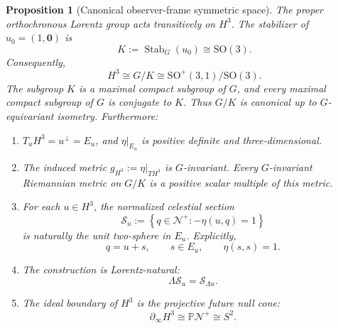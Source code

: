 \documentclass[11pt]{article}
\newtheorem{proposition}[theorem]{Proposition}
\begin{document}
\begin{proposition}[Canonical observer-frame symmetric space]
\label{prop:h3-frame-space}
The proper orthochronous Lorentz group acts transitively on \(H^3\). The
stabilizer of \(u_0=(1,\mathbf0)\) is
\[
K:=\operatorname{Stab}_G(u_0)\cong\mathrm{SO}(3).
\]
Consequently,
\[
\boxed{
H^3\cong G/K\cong \mathrm{SO}^{+}(3,1)/\mathrm{SO}(3).
}
\]
The subgroup \(K\) is a maximal compact subgroup of \(G\), and every maximal
compact subgroup of \(G\) is conjugate to \(K\). Thus \(G/K\) is canonical up
to \(G\)-equivariant isometry. Furthermore:
\begin{enumerate}[leftmargin=2em]
\item \(T_uH^3=u^\perp=E_u\), and \(\eta|_{E_u}\) is positive definite and
three-dimensional.
\item The induced metric \(g_{H^3}:=\eta|_{TH^3}\) is \(G\)-invariant. Every
\(G\)-invariant Riemannian metric on \(G/K\) is a positive scalar multiple of
this metric.
\item For each \(u\in H^3\), the normalized celestial section
\[
\mathcal S_u:=\left\{q\in\mathcal N^+:-\eta(u,q)=1\right\}
\]
is naturally the unit two-sphere in \(E_u\). Explicitly,
\[
q=u+s,\qquad s\in E_u,\qquad \eta(s,s)=1.
\]
\item The construction is Lorentz-natural:
\[
\Lambda\mathcal S_u=\mathcal S_{\Lambda u}.
\]
\item The ideal boundary of \(H^3\) is the projective future null cone:
\[
\boxed{
\partial_\infty H^3\cong\mathbb P\mathcal N^+\cong S^2.
}
\]
\end{enumerate}
\end{proposition}
\end{document}
